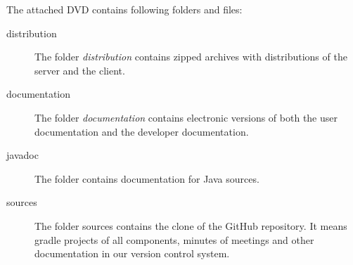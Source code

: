 
The attached DVD contains following folders and files:
\begin{description}
\item[distribution] The folder \emph{distribution} contains zipped archives with
distributions of the server and the client.
\item[documentation] The folder \emph{documentation} contains electronic versions
of both the user documentation and the developer documentation.
\item[javadoc] The folder \emph{} contains documentation for Java sources.
\item[sources] The folder sources contains the clone of the GitHub repository.
It means gradle projects of all components, minutes of meetings and other documentation
in our version control system. 
\end{description}
